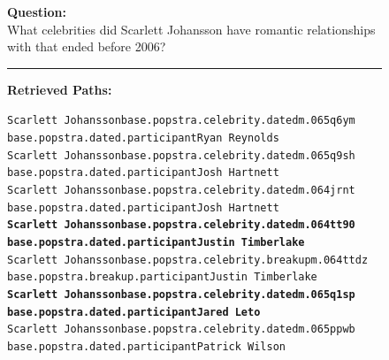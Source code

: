 \begin{figure}[t]
\begin{tcolorbox}[colback=gray!5!white,
                  colframe=gray!75!black,
                  title=CWQ-WebQTest-213\_cbbd86314870b15371b43439eb40587a]
\scriptsize

\textbf{Question:}\\
What celebrities did Scarlett Johansson have romantic relationships with that ended before 2006?

\rule{\linewidth}{0.4pt}

\textbf{Retrieved Paths:}\\[2pt]
{\raggedright
\texttt{Scarlett Johansson\patharrow base.popstra.celebrity.dated\patharrow m.065q6ym\patharrow \\ base.popstra.dated.participant\patharrow Ryan Reynolds}\\[6pt]

\texttt{Scarlett Johansson\patharrow base.popstra.celebrity.dated\patharrow m.065q9sh\patharrow \\ base.popstra.dated.participant\patharrow Josh Hartnett}\\[6pt]

\texttt{Scarlett Johansson\patharrow base.popstra.celebrity.dated\patharrow m.064jrnt\patharrow \\ base.popstra.dated.participant\patharrow Josh Hartnett}\\[6pt]

\texttt{\textbf{Scarlett Johansson\patharrow base.popstra.celebrity.dated\patharrow m.064tt90\patharrow \\ base.popstra.dated.participant\patharrow Justin Timberlake}}\\[6pt]

\texttt{Scarlett Johansson\patharrow base.popstra.celebrity.breakup\patharrow m.064ttdz\patharrow \\ base.popstra.breakup.participant\patharrow Justin Timberlake}\\[6pt]

\texttt{\textbf{Scarlett Johansson\patharrow base.popstra.celebrity.dated\patharrow m.065q1sp\patharrow \\ base.popstra.dated.participant\patharrow Jared Leto}}\\[6pt]

\texttt{Scarlett Johansson\patharrow base.popstra.celebrity.dated\patharrow m.065ppwb\patharrow \\ base.popstra.dated.participant\patharrow Patrick Wilson}\\[6pt]

}
\end{tcolorbox}
\end{figure}
